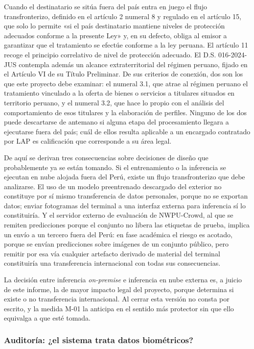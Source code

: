 Cuando el destinatario se sitúa fuera del país entra en juego el flujo
transfronterizo, definido en el artículo 2 numeral 8 y regulado en el
artículo 15, que solo lo permite «si el país destinatario mantiene
niveles de protección adecuados conforme a la presente Ley» y, en su
defecto, obliga al emisor a garantizar que el tratamiento se efectúe
conforme a la ley peruana. El artículo 11 recoge el principio
correlativo de nivel de protección adecuado. El D.S. 016-2024-JUS
contempla además un alcance extraterritorial del régimen peruano, fijado
en el Artículo VI de su Título Preliminar. De sus criterios de conexión,
dos son los que este proyecto debe examinar: el numeral 3.1, que atrae
al régimen peruano el tratamiento vinculado a la oferta de bienes o
servicios a titulares situados en territorio peruano, y el numeral 3.2,
que hace lo propio con el análisis del comportamiento de esos titulares
y la elaboración de perfiles. Ninguno de los dos puede descartarse de
antemano si alguna etapa del procesamiento llegara a ejecutarse fuera
del país; cuál de ellos resulta aplicable a un encargado contratado por
LAP es calificación que corresponde a su área legal.

De aquí se derivan tres consecuencias sobre decisiones de diseño que
probablemente ya se están tomando. Si el entrenamiento o la inferencia
se ejecutan en nube alojada fuera del Perú, existe un flujo
transfronterizo que debe analizarse. El uso de un modelo preentrenado
descargado del exterior no constituye por sí mismo transferencia de
datos personales, porque no se exportan datos; enviar fotogramas del
terminal a una interfaz externa para inferencia sí lo constituiría. Y el
servidor externo de evaluación de NWPU-Crowd, al que se remiten
predicciones porque el conjunto no libera las etiquetas de prueba,
implica un envío a un tercero fuera del Perú: en fase académica el
riesgo es acotado, porque se envían predicciones sobre imágenes de un
conjunto público, pero remitir por esa vía cualquier artefacto derivado
de material del terminal constituiría una transferencia internacional
con todas sus consecuencias.

La decisión entre inferencia \emph{on-premise} e inferencia en nube
externa es, a juicio de este informe, la de mayor impacto legal del
proyecto, porque determina si existe o no transferencia internacional.
Al cerrar esta versión no consta por escrito, y la medida M-01 la
anticipa en el sentido más protector sin que ello equivalga a que esté
tomada.

\subsubsection{Auditoría: ¿el sistema trata datos biométricos?}

